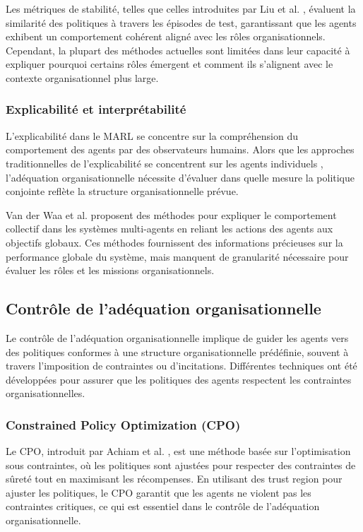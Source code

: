 \documentclass[sigconf,anonymous]{aamas}
\begin{document}
Les métriques de stabilité, telles que celles introduites par Liu et al. \cite{liu2021efficient}, évaluent la similarité des politiques à travers les épisodes de test, garantissant que les agents exhibent un comportement cohérent aligné avec les rôles organisationnels. Cependant, la plupart des méthodes actuelles sont limitées dans leur capacité à expliquer pourquoi certains rôles émergent et comment ils s'alignent avec le contexte organisationnel plus large.

\subsubsection{Explicabilité et interprétabilité}
L'explicabilité dans le MARL se concentre sur la compréhension du comportement des agents par des observateurs humains. Alors que les approches traditionnelles de l'explicabilité se concentrent sur les agents individuels \cite{van2018explainable}, l'adéquation organisationnelle nécessite d'évaluer dans quelle mesure la politique conjointe reflète la structure organisationnelle prévue.

Van der Waa et al. \cite{van2020explainability} proposent des méthodes pour expliquer le comportement collectif dans les systèmes multi-agents en reliant les actions des agents aux objectifs globaux. Ces méthodes fournissent des informations précieuses sur la performance globale du système, mais manquent de granularité nécessaire pour évaluer les rôles et les missions organisationnels.

\subsection{Contrôle de l'adéquation organisationnelle}
Le contrôle de l'adéquation organisationnelle implique de guider les agents vers des politiques conformes à une structure organisationnelle prédéfinie, souvent à travers l'imposition de contraintes ou d'incitations. Différentes techniques ont été développées pour assurer que les politiques des agents respectent les contraintes organisationnelles.

\subsubsection{Constrained Policy Optimization (CPO)}
Le CPO, introduit par Achiam et al. \cite{achiam2017cpo}, est une méthode basée sur l'optimisation sous contraintes, où les politiques sont ajustées pour respecter des contraintes de sûreté tout en maximisant les récompenses. En utilisant des trust region pour ajuster les politiques, le CPO garantit que les agents ne violent pas les contraintes critiques, ce qui est essentiel dans le contrôle de l'adéquation organisationnelle.
\end{document}
